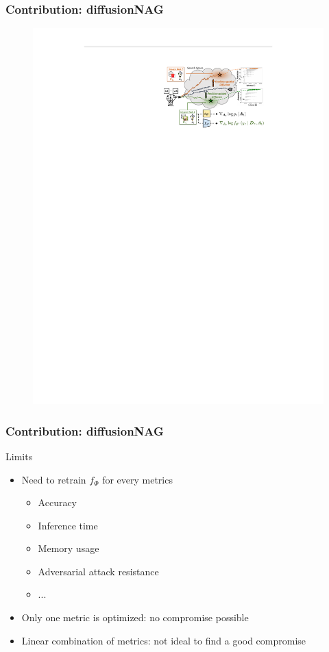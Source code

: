 \documentclass[aspectratio=169,xcolor=dvipsnames]{beamer}
\begin{document}
\begin{frame}
    \frametitle{Contribution: diffusionNAG}
    \begin{figure}[htbp]
        \centering
        \includegraphics[height=.80\textheight]{diffusionNAG_part2.pdf}
    \end{figure}
\end{frame}
\begin{frame}
    \frametitle{Contribution: diffusionNAG}
    Limits
    \begin{itemize}
        \item Need to retrain $ f_\Phi $ for every metrics
              \begin{itemize}
                  \item Accuracy
                  \item Inference time
                  \item Memory usage
                  \item Adversarial attack resistance
                  \item ...
              \end{itemize}
        \item Only one metric is optimized: no compromise possible
        \item Linear combination of metrics: not ideal to find a good compromise
    \end{itemize}
\end{frame}
\end{document}
